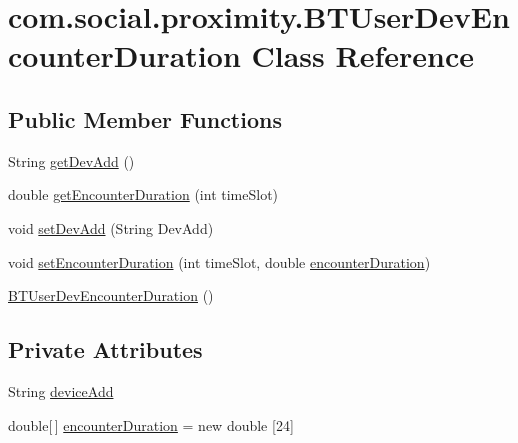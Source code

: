 \hypertarget{classcom_1_1social_1_1proximity_1_1_b_t_user_dev_encounter_duration}{}\section{com.\+social.\+proximity.\+B\+T\+User\+Dev\+Encounter\+Duration Class Reference}
\label{classcom_1_1social_1_1proximity_1_1_b_t_user_dev_encounter_duration}
\subsection*{Public Member Functions}
\begin{DoxyCompactItemize}
\item 
String \hyperlink{classcom_1_1social_1_1proximity_1_1_b_t_user_dev_encounter_duration_a8dbb763c7a2cd0abc21e5b8d08f059cb}{get\+Dev\+Add} ()
\item 
double \hyperlink{classcom_1_1social_1_1proximity_1_1_b_t_user_dev_encounter_duration_abac9cb877fa764e73188d4a5cbb60dd4}{get\+Encounter\+Duration} (int time\+Slot)
\item 
void \hyperlink{classcom_1_1social_1_1proximity_1_1_b_t_user_dev_encounter_duration_aeab922da5e8c708d34f19d2f7235721f}{set\+Dev\+Add} (String Dev\+Add)
\item 
void \hyperlink{classcom_1_1social_1_1proximity_1_1_b_t_user_dev_encounter_duration_ae4b1386a7fe6f392882da0373b7e80e4}{set\+Encounter\+Duration} (int time\+Slot, double \hyperlink{classcom_1_1social_1_1proximity_1_1_b_t_user_dev_encounter_duration_ad826a1577bfc1a957ad1c33b5e2542f0}{encounter\+Duration})
\item 
\hyperlink{classcom_1_1social_1_1proximity_1_1_b_t_user_dev_encounter_duration_a87fc456297dba1d21893fa4513e765f1}{B\+T\+User\+Dev\+Encounter\+Duration} ()
\end{DoxyCompactItemize}
\subsection*{Private Attributes}
\begin{DoxyCompactItemize}
\item 
String \hyperlink{classcom_1_1social_1_1proximity_1_1_b_t_user_dev_encounter_duration_a3f0cb0e0e2fde585f9bd82c28e6d0f22}{device\+Add}
\item 
double\mbox{[}$\,$\mbox{]} \hyperlink{classcom_1_1social_1_1proximity_1_1_b_t_user_dev_encounter_duration_ad826a1577bfc1a957ad1c33b5e2542f0}{encounter\+Duration} = new double \mbox{[}24\mbox{]}
\end{DoxyCompactItemize}


